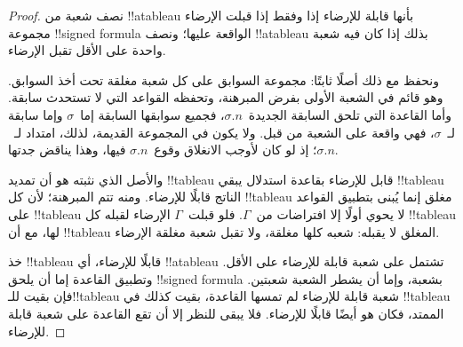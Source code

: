 \documentclass[../../../include/open-logic-section]{subfiles}
\begin{document}
\begin{proof}
نصف شعبة من !!a{tableau} بأنها قابلة للإرضاء إذا وفقط إذا قبلت الإرضاء
مجموعة !!{signed formula} الواقعة عليها؛ ونصف !!a{tableau} بذلك إذا
كان فيه شعبة واحدة على الأقل تقبل الإرضاء.

ونحفظ مع ذلك أصلًا ثابتًا: مجموعة السوابق على كل شعبة مغلقة تحت أخذ
السوابق. وهو قائم في الشعبة الأولى بفرض المبرهنة، وتحفظه القواعد التي لا
تستحدث سابقة. وأما القاعدة التي تلحق السابقة الجديدة~$\sigma.n$، فجميع
سوابقها السابقة إما~$\sigma$ وإما سابقة لـ~$\sigma$، فهي واقعة على
الشعبة من قبل. ولا يكون في المجموعة القديمة، لذلك، امتداد لـ~$\sigma.n$؛
إذ لو كان لأوجب الانغلاق وقوع~$\sigma.n$ فيها، وهذا يناقض جدتها.

والأصل الذي نثبته هو أن تمديد !!{tableau} قابل للإرضاء بقاعدة استدلال
يبقي !!{tableau} الناتج قابلًا للإرضاء. ومنه تتم المبرهنة؛ لأن كل
!!{tableau} مغلق إنما يُبنى بتطبيق القواعد على !!{tableau} لا يحوي
أولًا إلا افتراضات من~$\Gamma$. فلو قبلت~$\Gamma$ الإرضاء لقبله كل
!!{tableau} لها، مع أن !!{tableau} المغلق لا يقبله: شعبه كلها مغلقة،
ولا تقبل شعبة مغلقة الإرضاء.

خذ !!{tableau} قابلًا للإرضاء، أي !!a{tableau} تشتمل على شعبة قابلة
للإرضاء على الأقل. وتطبيق القاعدة إما أن يلحق !!{signed formula}
بشعبة، وإما أن يشطر الشعبة شعبتين. فإن بقيت للـ!!{tableau} شعبة قابلة للإرضاء لم تمسها
القاعدة، بقيت كذلك في !!{tableau} الممتد، فكان هو أيضًا قابلًا للإرضاء.
فلا يبقى للنظر إلا أن تقع القاعدة على شعبة قابلة للإرضاء.


\end{proof}
\end{document}

